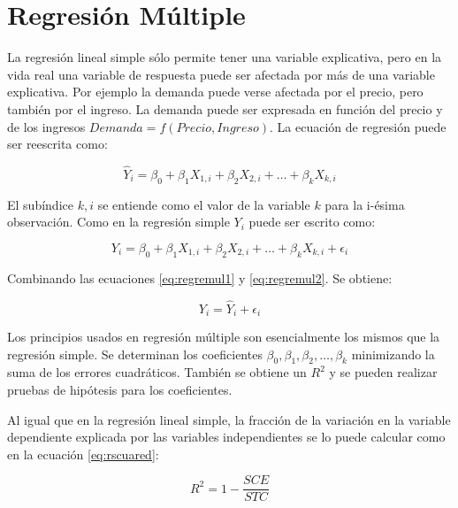 \documentclass[letterpaper,]{book}
\begin{document}
\hypertarget{mult}{%
\section{Regresión Múltiple}\label{mult}}

La regresión lineal simple sólo permite tener una variable explicativa, pero en la vida real una variable de respuesta puede ser afectada por más de una variable explicativa. Por ejemplo la demanda puede verse afectada por el precio, pero también por el ingreso. La demanda puede ser expresada en función del precio y de los ingresos \(Demanda=f\left(Precio,Ingreso\right)\). La ecuación de regresión puede ser reescrita como:

\begin{equation}
\hat{Y}_i = \beta_0 + \beta_1 X_{1,i} + \beta_2 X_{2,i}  + \ldots + \beta_k X_{k,i}
    \label{eq:regremul1}
\end{equation}

El subíndice \(k,i\) se entiende como el valor de la variable \(k\) para la i-ésima observación. Como en la regresión simple \(Y_i\) puede ser escrito como:

\begin{equation}
Y_i = \beta_0 + \beta_1 X_{1,i} + \beta_2 X_{2,i}  + \ldots + \beta_k X_{k,i} + \epsilon_i
    \label{eq:regremul2}
\end{equation}

Combinando las ecuaciones \eqref{eq:regremul1} y \eqref{eq:regremul2}. Se obtiene:

\begin{equation}
Y_i = \hat{Y}_i + \epsilon_i
    \label{eq:regremul3}
\end{equation}

Los principios usados en regresión múltiple son esencialmente los mismos que la regresión simple. Se determinan los coeficientes \(\beta_0,\beta_1,\beta_2,\ldots,\beta_k\) minimizando la suma de los errores cuadráticos. También se obtiene un \(R^2\) y se pueden realizar pruebas de hipótesis para los coeficientes.

Al igual que en la regresión lineal simple, la fracción de la variación en la variable dependiente explicada por las variables independientes se lo puede calcular como en la ecuación \eqref{eq:rscuared}:

\begin{equation}
R^2 = 1 - \dfrac{SCE}{STC}
    \label{eq:rscuared2}
\end{equation}
\end{document}
